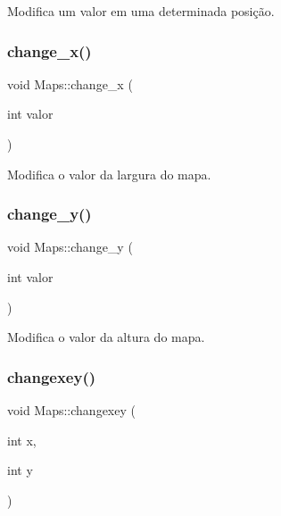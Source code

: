 Modifica um valor em uma determinada posição. 

\mbox{\label{classMaps_a0ed4b3dd55951294a26ef3c54ede92fb}} 
\subsubsection{\texorpdfstring{change\+\_\+x()}{change\_x()}}
{\footnotesize\ttfamily void Maps\+::change\+\_\+x (\begin{DoxyParamCaption}\item[{int}]{valor }\end{DoxyParamCaption})\hspace{0.3cm}{\ttfamily [inline]}}



Modifica o valor da largura do mapa. 

\mbox{\label{classMaps_ae66359ffa0d8570dd5d6329a5733047d}} 
\subsubsection{\texorpdfstring{change\+\_\+y()}{change\_y()}}
{\footnotesize\ttfamily void Maps\+::change\+\_\+y (\begin{DoxyParamCaption}\item[{int}]{valor }\end{DoxyParamCaption})\hspace{0.3cm}{\ttfamily [inline]}}



Modifica o valor da altura do mapa. 

\mbox{\label{classMaps_af3d935925e955f25aa02659b6c670245}} 
\subsubsection{\texorpdfstring{changexey()}{changexey()}}
{\footnotesize\ttfamily void Maps\+::changexey (\begin{DoxyParamCaption}\item[{int}]{x,  }\item[{int}]{y }\end{DoxyParamCaption})\hspace{0.3cm}{\ttfamily [inline]}}



